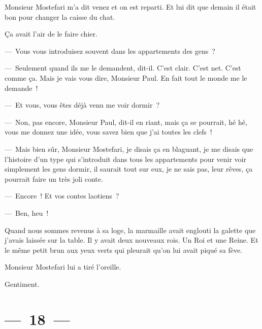 \documentclass[twoside]{book} %
\begin{document}
Monsieur Mostefari m’a dit venez et on est reparti. Et lui dit que demain il était bon pour changer la caisse du chat.\par
Ça avait l’air de le faire chier.\par
— Vous vous introduisez souvent dans les appartements des gens ?\par
— Seulement quand ils me le demandent, dit-il. C’est clair. C’est net. C’est comme ça. Mais je vais vous dire, Monsieur Paul. En fait tout le monde me le demande !\par
— Et vous, vous êtes déjà venu me voir dormir ?\par
— Non, pas encore, Monsieur Paul, dit-il en riant, mais ça se pourrait, hé hé, vous me donnez une idée, vous savez bien que j’ai toutes les clefs !\par
— Mais bien sûr, Monsieur Mostefari, je disais ça en blaguant, je me disais que l’histoire d’un type qui s’introduit dans tous les appartements pour venir voir simplement les gens dormir, il saurait tout sur eux, je ne sais pas, leur rêves, ça pourrait faire un très joli conte.\par
— Encore ! Et vos contes laotiens ?\par
— Ben, heu !\par
Quand nous sommes revenus à sa loge, la marmaille avait englouti la galette que j’avais laissée sur la table. Il y avait deux nouveaux rois. Un Roi et une Reine. Et le même petit brun aux yeux verts qui pleurait qu’on lui avait piqué sa fève.\par
Monsieur Mostefari lui a tiré l’oreille.\par
Gentiment.

\section[{— 18 —}]{— 18 —}
\renewcommand{\leftmark}{— 18 —}
\end{document}
